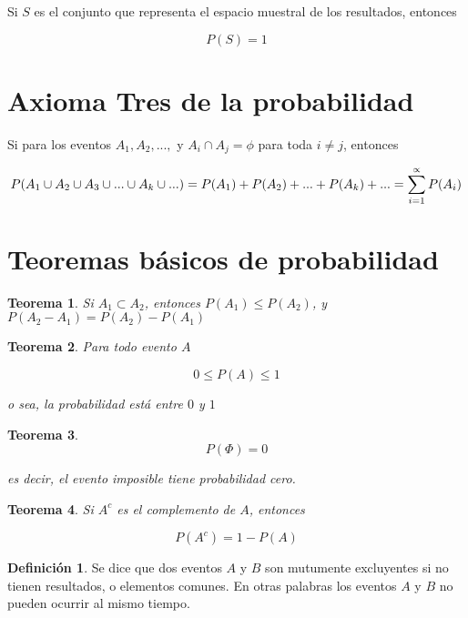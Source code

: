 \documentclass[
]{book}
\newtheorem{theorem}{Teorema}[chapter]
\theoremstyle{definition}
\newtheorem{definition}{Definición}[chapter]
\theoremstyle{definition}
\theoremstyle{definition}
\theoremstyle{definition}
\theoremstyle{remark}
\begin{document}
Si \(S\) es el conjunto que representa el espacio muestral de los resultados, entonces

\[P(S)=1\]

\hypertarget{axioma-tres-de-la-probabilidad}{%
\section{Axioma Tres de la probabilidad}\label{axioma-tres-de-la-probabilidad}}

Si para los eventos \(A_1,A_2,...,\) y \(A_i \cap A_j=\phi\) para toda \(i \neq j\), entonces

\begin{equation}
P(A_1 \cup A_2 \cup A_3 \cup...\cup A_k\cup...)=\\P(A_1)+P(A_2)+...+P(A_k)+...=\sum_{i=1}^{\propto}P(A_i)
\end{equation}

\hypertarget{teoremas-buxe1sicos-de-probabilidad}{%
\section{Teoremas básicos de probabilidad}\label{teoremas-buxe1sicos-de-probabilidad}}

\begin{theorem}
\protect\hypertarget{thm:TMA1-1}{}{\label{thm:TMA1-1} }Si \(A_1 \subset A_2\), entonces \(P(A_1) \leq P(A_2)\), y \(P(A_2-A_1)=P(A_2)-P(A_1)\)
\end{theorem}

\begin{theorem}
\protect\hypertarget{thm:TMA1-2}{}{\label{thm:TMA1-2} }Para todo evento \(A\)

\[0 \leq P(A) \leq 1\]

o sea, la probabilidad está entre \(0\) y \(1\)
\end{theorem}

\begin{theorem}
\protect\hypertarget{thm:TMA1-3}{}{\label{thm:TMA1-3} }\[ P(\Phi)=0 \]

es decir, el evento imposible tiene probabilidad cero.
\end{theorem}

\begin{theorem}
\protect\hypertarget{thm:TMA1-4}{}{\label{thm:TMA1-4} }Si \(A^{c}\) es el complemento de \(A\), entonces

\[P(A^{c})=1-P(A)\]
\end{theorem}

\begin{definition}
\protect\hypertarget{def:unnamed-chunk-44}{}{\label{def:unnamed-chunk-44} }Se dice que dos eventos \(A\) y \(B\) son mutumente excluyentes si no tienen resultados, o elementos comunes. En otras palabras los eventos \(A\) y \(B\) no pueden ocurrir al mismo tiempo.
\end{definition}
\end{document}

